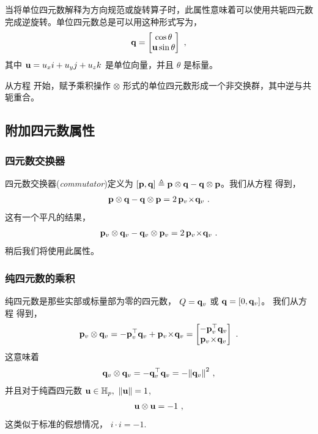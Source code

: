 当将单位四元数解释为方向规范或旋转算子时，此属性意味着可以使用共轭四元数完成逆旋转。单位四元数总是可以用这种形式写为，
%
\begin{align}
{\bf q} = \begin{bmatrix}
\cos\theta \\ {\bf u}\sin\theta
\end{bmatrix}
~,
\end{align}
%
其中 ${\bf u} = u_x i + u_y j + u_z k$ 是单位向量，并且 $\theta$ 是标量。 

从方程  开始，赋予乘积操作 $\otimes$ 形式的单位四元数形成一个非交换群，其中逆与共轭重合。 


\subsection{附加四元数属性}

\subsubsection{四元数交换器}

四元数交换器(\emph{commutator})定义为 $[{\bf p},{\bf q}]\triangleq{\bf p}\otimes{\bf q}-{\bf q}\otimes{\bf p}$。我们从方程  得到，
%
\begin{align}
{\bf p}\otimes{\bf q}-{\bf q}\otimes{\bf p} = 2\,{\bf p}_v\!\times\!{\bf q}_v
~.
\label{equ:quatCommutator}
\end{align}
%
这有一个平凡的结果，
%
\begin{align}
{\bf p}_v\otimes{\bf q}_v-{\bf q}_v\otimes{\bf p}_v = 2\,{\bf p}_v\!\times\!{\bf q}_v
~.
\label{equ:quatCommutatorPure}
\end{align}
%
稍后我们将使用此属性。


\subsubsection{纯四元数的乘积}

纯四元数是那些实部或标量部为零的四元数， $Q={\bf q}_v$ 或 ${\bf q}=[0,{\bf q}_v]$。 我们从方程  得到，
%
\begin{align}
{\bf p}_v\otimes{\bf q}_v 
= -{\bf p}_v^{\top}{\bf q}_v + {\bf p}_v\!\times\!{\bf q}_v
= \begin{bmatrix}
-{\bf p}_v^{\top}{\bf q}_v \\
{\bf p}_v\!\times\!{\bf q}_v
\end{bmatrix}~.
\label{equ:quatProdPure}
\end{align}
%
这意味着
%
\begin{align}
{\bf q}_v\otimes{\bf q}_v = -{\bf q}_v^{\top}{\bf q}_v = -{\left\|{\bf q}_v\right\|}^2~,
\label{equ:quatPureSquared}
\end{align}
%
并且对于纯酉四元数 ${\bf u}\in{\mathbb H}_p,~ {\left\|{\bf u}\right\|}=1$,
%
\begin{align}
{\bf u}\otimes{\bf u} = -1
~,
\end{align}
%
这类似于标准的假想情况， $i\cdot i=-1$.

